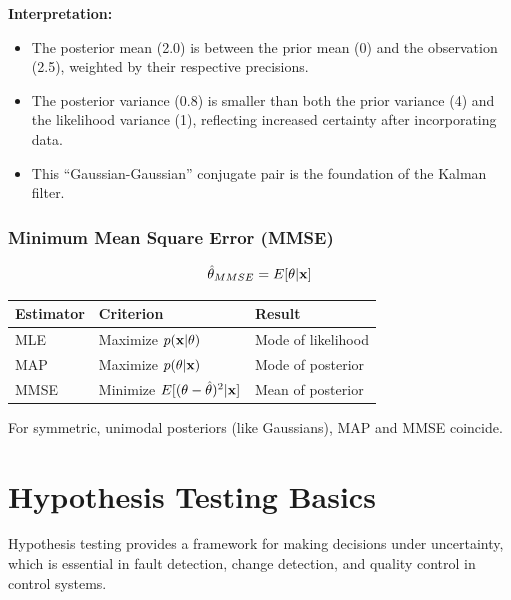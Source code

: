 \begin{examplebox}[title=Example: Bayesian Parameter Estimation]
\textbf{Interpretation:}
\begin{itemize}
    \item The posterior mean (2.0) is between the prior mean (0) and the observation (2.5), weighted by their respective precisions.
    \item The posterior variance (0.8) is smaller than both the prior variance (4) and the likelihood variance (1), reflecting increased certainty after incorporating data.
    \item This ``Gaussian-Gaussian'' conjugate pair is the foundation of the Kalman filter.
\end{itemize}
\end{examplebox}



\subsubsection{Minimum Mean Square Error (MMSE)}
\begin{equation}
\hat{\theta}_{MMSE} = E[\theta|\mathbf{x}]
\end{equation}

\begin{keyconceptbox}[title=Comparison of Estimators]
\begin{center}
\begin{tabular}{lll}
\toprule
\textbf{Estimator} & \textbf{Criterion} & \textbf{Result} \\
\midrule
MLE & Maximize $p(\mathbf{x}|\theta)$ & Mode of likelihood \\
MAP & Maximize $p(\theta|\mathbf{x})$ & Mode of posterior \\
MMSE & Minimize $E[(\theta - \hat{\theta})^2|\mathbf{x}]$ & Mean of posterior \\
\bottomrule
\end{tabular}
\end{center}
For symmetric, unimodal posteriors (like Gaussians), MAP and MMSE coincide.
\end{keyconceptbox}

\section{Hypothesis Testing Basics}

Hypothesis testing provides a framework for making decisions under uncertainty, which is essential in fault detection, change detection, and quality control in control systems.

